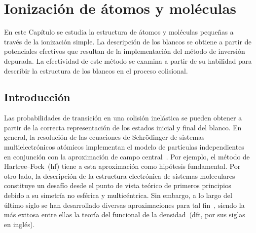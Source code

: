 \chapter{Ionización de átomos y moléculas}
\label{chap:iondim}

En este Capítulo se estudia la estructura de átomos y moléculas pequeñas
a través de la ionización simple. La descripción de los blancos se 
obtiene a partir de potenciales efectivos que resultan de la 
implementación del método de inversión depurada. La efectividad de este 
método se examina a partir de su habilidad para describir la estructura 
de los blancos en el proceso colisional.

\section{Introducción}


Las probabilidades de transición en una colisión inelástica se pueden 
obtener a partir de la correcta representación de los estados inicial y 
final del blanco. En general, la resolución de las ecuaciones de 
Schr\"odinger de sistemas multielectrónicos atómicos implementan el 
modelo de partículas independientes en conjunción con la aproximación 
de campo central~\cite{Bransden:03,Cowan:81}. Por ejemplo, el método de 
Hartree--Fock~(\acs{hf}) tiene a esta aproximación como hipótesis 
fundamental. Por otro lado, la descripción de la estructura electrónica 
de sistemas moleculares constituye un desafío desde el punto de vista 
teórico de primeros principios debido a su simetría no esférica y 
multicéntrica. Sin embargo, a lo largo del último siglo se han 
desarrollado diversas aproximaciones para tal 
fin~\cite{Helgaker:00,Schaefer:04}, siendo la más exitosa entre ellas la 
teoría del funcional de la densidad~(\acs{dft}, por sus siglas en 
inglés).

